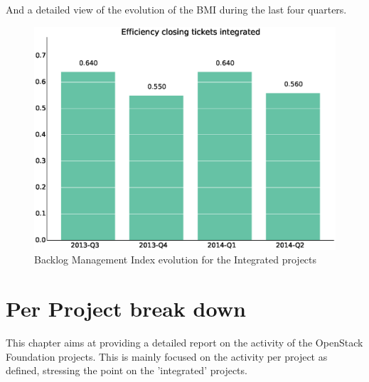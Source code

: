 \documentclass[a4wide,11pt]{report}
\begin{document}
And a detailed view of the evolution of the BMI during the last four quarters.

\begin{figure}[H]
\centering
\includegraphics[scale=.35]{figs/bmiintegrated.eps}
\caption{Backlog Management Index evolution for the Integrated projects}
\end{figure}







\chapter{Per Project break down}

This chapter aims at providing a detailed report on the activity of the OpenStack Foundation projects.
This is mainly focused on the activity per project as defined, stressing the point on the 'integrated' projects.
\end{document}

